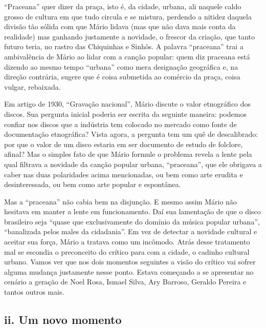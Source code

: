 ``Praceana'' quer dizer da praça, isto é, da cidade, urbana, ali naquele
caldo grosso de cultura em que tudo circula e se mistura, perdendo a
nitidez daquela divisão tão sólida com que Mário lidava (mas que não
dava mais conta da realidade) mas ganhando justamente a novidade, o
frescor da criação, que tanto futuro teria, no rastro das Chiquinhas e
Sinhôs. A palavra ``praceana'' trai a ambivalência de Mário ao lidar com
a canção popular: quem diz praceana está dizendo ao mesmo tempo
``urbana'' como mera designação geográfica e, na direção contrária,
sugere que é coisa submetida ao comércio da praça, coisa vulgar,
rebaixada.

Em artigo de 1930, ``Gravação nacional'', Mário discute o valor
etnográfico dos discos. Sua pergunta inicial poderia ser escrita da
seguinte maneira: podemos confiar nos discos que a indústria tem
colocado no mercado como fonte de documentação etnográfica? Vista agora,
a pergunta tem um quê de descalibrado: por que o valor de um disco
estaria em ser documento de estudo de folclore, afinal? Mas o simples
fato de que Mário formule o problema revela a lente pela qual filtrava a
novidade da canção popular urbana, ``praceana'', que ele obrigava a
caber nas duas polaridades acima mencionadas, ou bem como arte erudita e
desinteressada, ou bem como arte popular e espontânea.

Mas a ``praceana'' não cabia bem na disjunção. E mesmo assim Mário não
hesitava em manter a lente em funcionamento. Daí sua lamentação de que o
disco brasileiro seja ``quase que exclusivamente do domínio da música
popular urbana'', ``banalizada pelos males da cidadania''. Em vez de
detectar a novidade cultural e aceitar sua força, Mário a tratava como
um incômodo. Atrás desse tratamento mal se escondia o preconceito do
crítico para com a cidade, o cadinho cultural urbano. Vamos ver que nos
dois momentos seguintes a visão do crítico vai sofrer alguma mudança
justamente nesse ponto. Estava começando a se apresentar no cenário a
geração de Noel Rosa, Ismael Silva, Ary Barroso, Geraldo Pereira e
tantos outros mais.

\subsection{ii. Um novo momento}

